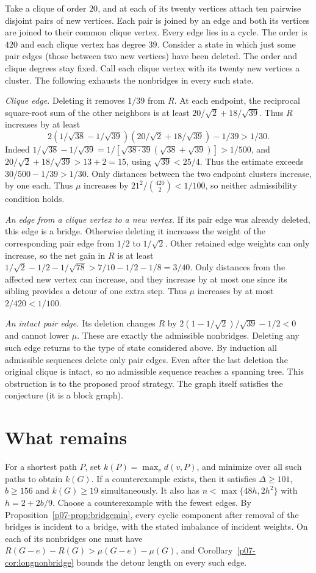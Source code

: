 \documentclass[11pt,a4paper]{article}
\begin{document}
Take a clique of order $20$, and at each of its twenty vertices attach
ten pairwise disjoint pairs of new vertices. Each pair is joined by an
edge and both its vertices are joined to their common clique vertex.
Every edge lies in a cycle. The order is $420$ and each clique vertex
has degree $39$. Consider a state in which just some pair edges (those
between two new vertices) have been deleted. The order and clique
degrees stay fixed. Call each clique vertex with its twenty new vertices
a cluster. The following exhausts the nonbridges in every such state.

\emph{Clique edge.} Deleting it removes $1/39$ from $R$. At each
endpoint, the reciprocal square-root sum of the other neighbors is at
least $20/\sqrt2+18/\sqrt{39}$. Thus $R$ increases by at least
\[
 2(1/\sqrt{38}-1/\sqrt{39})(20/\sqrt2+18/\sqrt{39})-1/39
 > 1/30 .
\]
Indeed $1/\sqrt{38}-1/\sqrt{39}=1/[\sqrt{38\cdot39}(\sqrt{38}+\sqrt{39})]>1/500$,
and $20/\sqrt2+18/\sqrt{39}>13+2=15$, using $\sqrt{39}<25/4$.
Thus the estimate exceeds $30/500-1/39>1/30$.
Only distances between the two endpoint clusters increase, by one
each. Thus $\mu$ increases by $21^2/\binom{420}2<1/100$, so neither
admissibility condition holds.

\emph{An edge from a clique vertex to a new vertex.} If its pair
edge was already deleted, this edge is a bridge. Otherwise deleting
it increases the weight of the corresponding pair edge from $1/2$ to
$1/\sqrt2$. Other retained edge weights can only increase, so the net
gain in $R$ is at least $1/\sqrt2-1/2-1/\sqrt{78}>7/10-1/2-1/8=3/40$.
Only distances from the affected new vertex can increase, and they
increase by at most one since its sibling provides a detour of one
extra step. Thus $\mu$ increases by at most $2/420<1/100$.

\emph{An intact pair edge.} Its deletion changes $R$ by
$2(1-1/\sqrt2)/\sqrt{39}-1/2<0$ and cannot lower $\mu$.
These are exactly the admissible nonbridges. Deleting any such edge
returns to the type of state considered above. By induction all
admissible sequences delete only pair edges. Even after the last
deletion the original clique is intact, so no admissible sequence
reaches a spanning tree. This obstruction is to the proposed proof
strategy. The graph itself satisfies the conjecture (it is a block graph).

\section*{What remains}
For a shortest path $P$, set $k(P)=\max_v d(v,P)$, and minimize over
all such paths to obtain $k(G)$. If a counterexample exists, then it
satisfies $\Delta\ge101$, $b\ge156$ and $k(G)\ge19$ simultaneously.
It also has $n<\max\{48h,2h^2\}$ with $h=2+2b/9$.
Choose a counterexample with the fewest edges. By Proposition~\ref{p07-prop:bridgemin}, every cyclic component after removal of the bridges is incident to a bridge, with the stated imbalance of incident weights. On each of its nonbridges
one must have $R(G-e)-R(G)>\mu(G-e)-\mu(G)$, and
Corollary~\ref{p07-cor:longnonbridge} bounds the detour length on every such edge.
\end{document}
